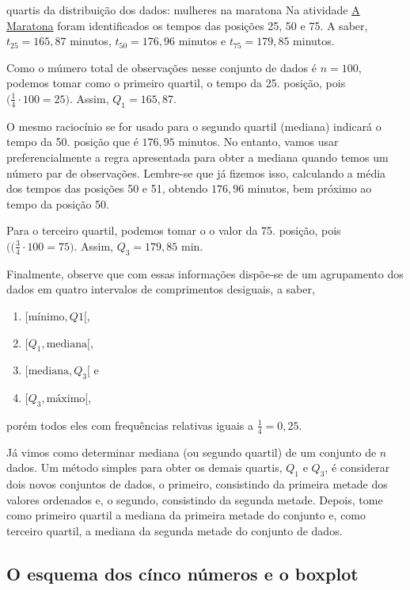 \begin{example}{quartis da distribuição dos dados: mulheres na maratona}
Na atividade \hyperref[\detokenize{PE104-0:ativ-maratona-de-ny}]{A Maratona} foram identificados os tempos das posições 25, 50 e 75. A saber, $t_25=165{,}87$ minutos, $t_50=176{,}96$ minutos e $t_75=179{,}85$ minutos.

Como o múmero total de observações nesse conjunto de dados é $n=100$, podemos tomar como o primeiro quartil, o tempo da 25. posição, pois $\big(\frac{1}{4}\cdot100=25\big)$. Assim, $Q_1=165{,}87$.

O mesmo raciocínio se for usado para o segundo quartil (mediana) indicará o tempo da 50. posição que é $176{,}95$ minutos. No entanto, vamos usar preferencialmente a regra apresentada para obter a mediana quando temos um número par de observações. Lembre-se que já fizemos isso, calculando a média dos tempos das posições 50 e 51, obtendo $176{,}96$ minutos, bem próximo ao tempo da posição 50.

Para o terceiro quartil, podemos tomar o o valor da 75. posição, pois $(\big(\frac{3}{4}\cdot100=75\big)$. Assim, $Q_3=179{,}85$ min.

Finalmente, observe que com essas informações dispõe-se de um agrupamento dos dados em quatro intervalos de comprimentos desiguais, a saber,

\begin{enumerate}
\item $[\text{mínimo},Q1[$,
\item $[Q_1,\text{mediana}[$,
\item $[\text{mediana},Q_3[$ e
\item $[Q_3,\text{máximo}[$,
\end{enumerate}

porém todos eles com frequências relativas iguais a $\frac{1}{4}=0{,}25$.
\end{example}

Já vimos como determinar mediana (ou segundo quartil) de um conjunto de $n$ dados. Um método simples para obter os demais quartis, $Q_1$ e $Q_3$, é considerar dois novos conjuntos de dados, o primeiro, consistindo da primeira metade dos valores ordenados e, o segundo, consistindo da segunda metade. Depois, tome como primeiro quartil a mediana da primeira metade do conjunto e, como terceiro quartil, a mediana da segunda metade do conjunto de dados.

\subsection{O esquema dos cínco números e o boxplot}

